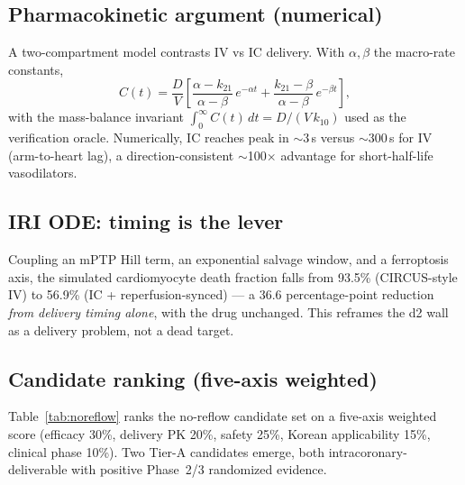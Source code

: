 \documentclass[11pt]{article}
\begin{document}
\subsection{Pharmacokinetic argument (numerical)}
A two-compartment model contrasts IV vs IC delivery. With $\alpha,\beta$ the macro-rate constants,
\begin{equation}
C(t) = \frac{D}{V}\left[\frac{\alpha - k_{21}}{\alpha - \beta}\,e^{-\alpha t} + \frac{k_{21}-\beta}{\alpha-\beta}\,e^{-\beta t}\right],
\label{eq:pk2comp}
\end{equation}
with the mass-balance invariant $\int_0^\infty C(t)\,dt = D/(V\,k_{10})$ used as the verification oracle. Numerically, IC reaches peak in $\sim$3\,s versus $\sim$300\,s for IV (arm-to-heart lag), a direction-consistent $\sim$100$\times$ advantage for short-half-life vasodilators.

\subsection{IRI ODE: timing is the lever}
Coupling an mPTP Hill term, an exponential salvage window, and a ferroptosis axis, the simulated cardiomyocyte death fraction falls from 93.5\% (CIRCUS-style IV) to 56.9\% (IC + reperfusion-synced) --- a 36.6 percentage-point reduction \emph{from delivery timing alone}, with the drug unchanged. This reframes the d2 wall as a delivery problem, not a dead target.

\subsection{Candidate ranking (five-axis weighted)}
Table~\ref{tab:noreflow} ranks the no-reflow candidate set on a five-axis weighted score (efficacy 30\%, delivery PK 20\%, safety 25\%, Korean applicability 15\%, clinical phase 10\%). Two Tier-A candidates emerge, both intracoronary-deliverable with positive Phase~2/3 randomized evidence.
\end{document}
